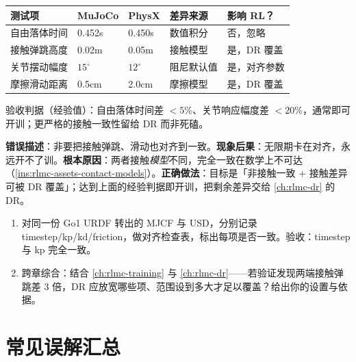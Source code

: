 \begin{center}
\small
\begin{tabular}{@{}lllll@{}}
\toprule
测试项 & MuJoCo & PhysX & 差异来源 & 影响 RL？ \\
\midrule
自由落体时间 & 0.452s & 0.450s & 数值积分 & 否，忽略 \\
接触弹跳高度 & 0.02m & 0.05m & 接触模型 & 是，DR 覆盖 \\
关节摆动幅度 & $15^\circ$ & $12^\circ$ & 阻尼默认值 & 是，对齐参数 \\
摩擦滑动距离 & 0.5cm & 2.0cm & 摩擦模型 & 是，DR 覆盖 \\
\bottomrule
\end{tabular}
\end{center}

验收判据（经验值）：自由落体时间差 $<5\%$、关节响应幅度差 $<20\%$，通常即可开训；更严格的接触一致性留给 DR 而非死磕。

\begin{pitfall}
\textbf{错误描述}：非要把接触弹跳、滑动也对齐到一致。\textbf{现象后果}：无限期卡在对齐，永远开不了训。\textbf{根本原因}：两者接触\emph{模型}不同，完全一致在数学上不可达（\cref{ins:rlmc-assets-contact-models}）。\textbf{正确做法}：目标是「非接触一致 + 接触差异可被 DR 覆盖」；达到上面的经验判据即开训，把剩余差异交给 \cref{ch:rlmc-dr} 的 DR。
\end{pitfall}

\begin{practice}[动手：对齐与验证]
\begin{enumerate}
  \item 对同一份 Go1 URDF 转出的 MJCF 与 USD，分别记录 timestep/kp/kd/friction，做对齐检查表，标出每项是否一致。验收：timestep 与 kp 完全一致。
  \item 跨章综合：结合 \cref{ch:rlmc-training} 与 \cref{ch:rlmc-dr}——若验证发现两端接触弹跳差 3 倍，DR 应放宽哪些项、范围设到多大才足以覆盖？给出你的设置与依据。
\end{enumerate}
\end{practice}

\section*{常见误解汇总}
\label{sec:rlmc-assets-misconceptions}

